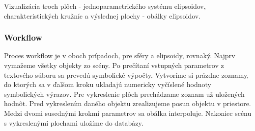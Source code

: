 Vizualizácia troch plôch - jednoparametrického systému elipsoidov, charakteristických kružníc a výslednej plochy - obálky elipsoidov.
\subsubsection{Workflow}
Proces workflow je v oboch prípadoch, pre sféry a elipsoidy, rovnaký.
Najprv vymažeme všetky objekty zo scény. Po prečítaní vstupných parametrov z textového súboru sa prevedú symbolické výpočty. Vytvoríme si prázdne zoznamy, do ktorých sa v ďalšom kroku ukladajú numericky vyčíslené hodnoty symbolických výrazov. Pre vykreslenie plôch prechádzame zoznam už uložených hodnôt. Pred vykreslením daného objektu zrealizujeme posun objektu v priestore. Medzi dvomi susednými krokmi parametrov sa obálka interpoluje. Nakoniec scénu s vykreslenými plochami uložíme do databázy.


